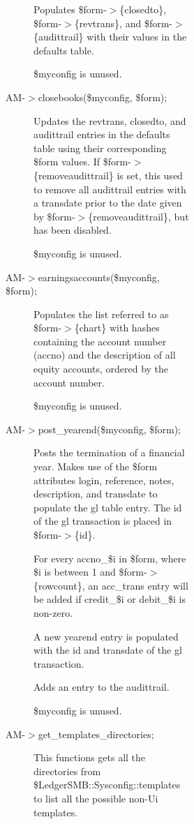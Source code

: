 \begin{description}
\begin{description}
\begin{description}
\begin{description}
\begin{description}
\begin{description}
\begin{description}
Populates \$form-$>$\{closedto\}, \$form-$>$\{revtrans\}, and \$form-$>$\{audittrail\} with
their values in the defaults table.



\$myconfig is unused.


\item[{AM-$>$closebooks(\$myconfig, \$form);}] \mbox{}

Updates the revtrans, closedto, and audittrail entries in the defaults table
using their corresponding \$form values.  If \$form-$>$\{removeaudittrail\} is set,
this used to remove all audittrail entries with a transdate prior to the date
given by \$form-$>$\{removeaudittrail\}, but has been disabled.



\$myconfig is unused.


\item[{AM-$>$earningsaccounts(\$myconfig, \$form);}] \mbox{}

Populates the list referred to as \$form-$>$\{chart\} with hashes containing the
account number (accno) and the description of all equity accounts, ordered by
the account number.



\$myconfig is unused.


\item[{AM-$>$post\_yearend(\$myconfig, \$form);}] \mbox{}

Posts the termination of a financial year.  Makes use of the \$form attributes
login, reference, notes, description, and transdate to populate the gl table
entry.  The id of the gl transaction is placed in \$form-$>$\{id\}.



For every accno\_\$i in \$form, where \$i is between 1 and \$form-$>$\{rowcount\}, an
acc\_trans entry will be added if credit\_\$i or debit\_\$i is non-zero.



A new yearend entry is populated with the id and transdate of the gl
transaction.



Adds an entry to the audittrail.



\$myconfig is unused.


\item[{AM-$>$get\_templates\_directories;}] \mbox{}

This functions gets all the directories from \$LedgerSMB::Sysconfig::templates to list all the possible
non-Ui templates.


\end{description}
\end{description}
\end{description}
\end{description}
\end{description}
\end{description}
\end{description}
